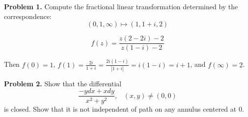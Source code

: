 \documentclass[letter,12pt,reqno]{article}
\date{\today}
\begin{document}
\pagestyle{fancy}


\begin{tcolorbox}
  \textbf{Problem 1.}
    Compute the fractional linear transformation determined by the correspondence:
    \[
        (0,1,\infty)\mapsto (1,1+i,2)
    \]
  
\end{tcolorbox}

\[f(z)=\frac{z(2-2i)-2}{z(1-i)-2}\]

Then $f(0)=1$, $f(1)=\frac{2i}{1+i}=\frac{2i(1-i)}{|1+i|}=i(1-i)=i+1$, and $f(\infty)=2$.

\begin{tcolorbox}
    \textbf{Problem 2.}
    Show that the differential \[\frac{-ydx+xdy}{x^2+y^2},\;\;\;(x,y)\not = (0,0)\]
    is closed. Show that it is not independent of path on any annulus centered at $0$.
\end{tcolorbox}
\end{document}
